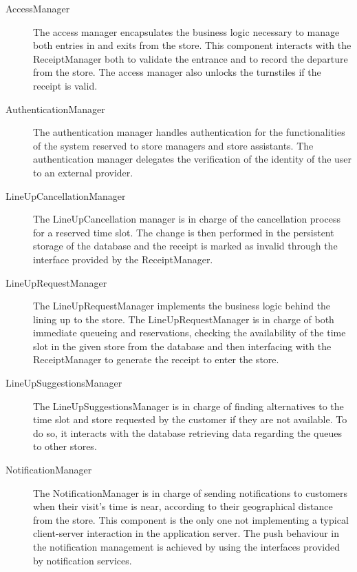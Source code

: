 \documentclass[../../main.tex]{subfiles}
\begin{document}
\begin{description}
    
    \item[AccessManager] The access manager encapsulates the business logic necessary to manage both entries in and exits from the store. 
    This component interacts with the ReceiptManager both to validate the entrance and to record the departure from the store. 
    The access manager also unlocks the turnstiles if the receipt is valid. 

    \item[AuthenticationManager] The authentication manager handles authentication for the functionalities of the 
    system reserved to store managers and store assistants. The authentication manager delegates the verification of the 
    identity of the user to an external provider.

    \item[LineUpCancellationManager] The LineUpCancellation manager is in charge of the cancellation process for 
    a reserved time slot. The change is then performed in the persistent storage of the database and the receipt is marked as 
    invalid through the interface provided by the ReceiptManager.
    
    \item[LineUpRequestManager] The LineUpRequestManager implements the business logic behind the lining up to the store. 
    The LineUpRequestManager is in charge of both immediate queueing and reservations, 
    checking the availability of the time slot in the given store from the database and then interfacing with the 
    ReceiptManager to generate the receipt to enter the store.

    \item[LineUpSuggestionsManager] The LineUpSuggestionsManager is in charge of finding alternatives to the time slot and 
    store requested by the customer if they are not available. To do so, it interacts with the database retrieving data 
    regarding the queues to other stores.

    \item[NotificationManager] The NotificationManager is in charge of sending notifications to customers when their visit's time is near, 
    according to their geographical distance from the store. This component is the only one not implementing a typical 
    client-server interaction in the application server. The push behaviour in the notification management is 
    achieved by using the interfaces provided by notification services.


\end{description}
\end{document}
